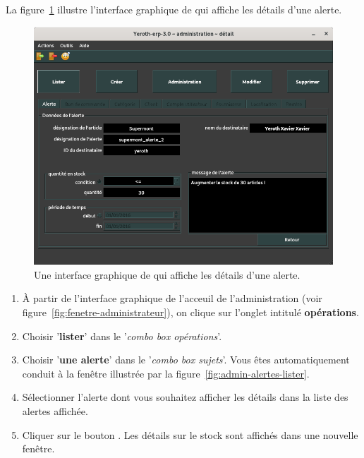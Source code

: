 \label{sec:administration-alertes}


La figure~\ref{fig:admin-alertes-afficher-details} illustre
l'interface graphique de \yeren qui affiche les d\'etails
d'une alerte.\\

\begin{figure}[!htpb]
	\centering
	\includegraphics[scale=0.45]{images/alerte-afficher-details.png}
	\caption{Une interface graphique de \yeren qui affiche les d\'etails
	d'une alerte.}\label{fig:admin-alertes-afficher-details}
\end{figure}

\begin{enumerate}[1)]
	\item \`A partir de l'interface graphique de l'acceuil de
		l'administration (voir figure~\ref{fig:fenetre-administrateur}),
		on clique sur l'onglet intitul\'e \textbf{op\'erations}. 
		
	\item Choisir '\textbf{lister}' dans le '\emph{combo box
		op\'erations}'.
		
	\item Choisir '\textbf{une alerte}' dans le '\emph{combo box
		sujets}'. Vous \^etes automatiquement conduit \`a la fen\^etre
		illustr\'ee par la figure~\ref{fig:admin-alertes-lister}.
		
	\item S\'electionner l'alerte dont vous souhaitez afficher
		les d\'etails dans la liste des alertes affich\'ee.
		
	\item Cliquer sur le bouton . Les d\'etails
		sur le stock sont affich\'es dans une nouvelle fen\^etre.
\end{enumerate}

